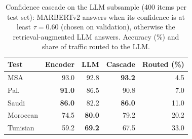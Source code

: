 \begin{table}[t]\centering\small\setlength{\tabcolsep}{4pt}\caption{Confidence cascade on the LLM subsample (400 items per test set): MARBERTv2 answers when its confidence is at least $\tau=0.60$ (chosen on validation), otherwise the retrieval-augmented LLM answers. Accuracy (\%) and share of traffic routed to the LLM.}\label{tab:cascade}
\begin{tabular}{lrrrr}\toprule
Test & Encoder & LLM & Cascade & Routed (\%) \\\midrule
MSA & 93.0 & 92.8 & \textbf{93.2} & 4.5 \\
Pal. & \textbf{91.0} & 86.5 & 90.8 & 7.0 \\
Saudi & \textbf{86.0} & 82.2 & \textbf{86.0} & 11.0 \\
Moroccan & 74.5 & \textbf{80.0} & 79.2 & 20.2 \\
Tunisian & 59.2 & \textbf{69.2} & 67.5 & 33.0 \\
\bottomrule\end{tabular}\end{table}

